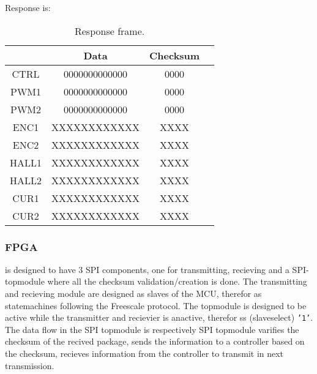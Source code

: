 Response is:

\begin{table}[h!]
\centering
\begin{tabular}{cccc}
\hline
\multicolumn{1}{|l|}{}       & \multicolumn{1}{c|}{Data}            & \multicolumn{1}{c|}{Checksum} \\ \hline
\multicolumn{1}{|c|}{CTRL}   & \multicolumn{1}{c|}{0000000000000}   & \multicolumn{1}{c|}{0000}     \\ \hline
\multicolumn{1}{|c|}{PWM1}   & \multicolumn{1}{c|}{0000000000000}   & \multicolumn{1}{c|}{0000}     \\ \hline
\multicolumn{1}{|c|}{PWM2}   & \multicolumn{1}{c|}{0000000000000}   & \multicolumn{1}{c|}{0000}     \\ \hline
\multicolumn{1}{|c|}{ENC1}   & \multicolumn{1}{c|}{XXXXXXXXXXXX}    & \multicolumn{1}{c|}{XXXX}     \\ \hline
\multicolumn{1}{|c|}{ENC2}   & \multicolumn{1}{c|}{XXXXXXXXXXXX}    & \multicolumn{1}{c|}{XXXX}     \\ \hline
\multicolumn{1}{|c|}{HALL1}  & \multicolumn{1}{c|}{XXXXXXXXXXXX}    & \multicolumn{1}{c|}{XXXX}     \\ \hline
\multicolumn{1}{|c|}{HALL2}  & \multicolumn{1}{c|}{XXXXXXXXXXXX}    & \multicolumn{1}{c|}{XXXX}     \\ \hline
\multicolumn{1}{|c|}{CUR1}   & \multicolumn{1}{c|}{XXXXXXXXXXXX}    & \multicolumn{1}{c|}{XXXX}     \\ \hline
\multicolumn{1}{|c|}{CUR2}   & \multicolumn{1}{c|}{XXXXXXXXXXXX}    & \multicolumn{1}{c|}{XXXX}     \\ \hline
\end{tabular}
\caption{Response frame.}
\end{table}

\subsubsection{FPGA}
is designed to have 3 SPI components, one for transmitting, recieving and a SPI-topmodule where all the checksum validation/creation is done. The transmitting and recieving module are designed as slaves of the MCU, therefor as statemachines following the Freescale protocol. The topmodule is designed to be active while the transmitter and recievier is anactive, therefor ss (slaveselect) \texttt{'1'}. The data flow in the SPI topmodule is respectively SPI topmodule varifies the checksum of the recived package, sends the information to a controller based on the checksum, recieves information from the controller to transmit in next transmission.



